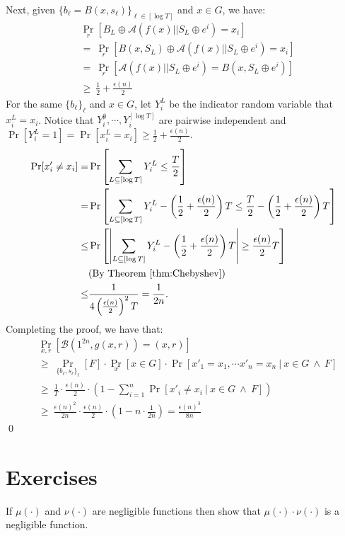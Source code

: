 \documentclass[12pt]{tufte-book}
\newcommand{\ma}{\mathcal{A}}
\begin{document}
Next, given $\{ b_\ell = B(x,s_\ell) \}_{\ell \in [\log T]}$ and $x\in G$, we have:
\begin{align*}
&\Pr_{r} \left[  B_L \oplus \ma(f(x) || S_L \oplus e^i) = x_i \right] \\
&=~ \Pr_{r} \left[ B(x,S_L) \oplus \ma(f(x) || S_L \oplus e^i) = x_i \right]\\
&=~ \Pr_{r} \left[ \ma(f(x) || S_L \oplus e^i) =  B(x,S_L \oplus e^i) \right]\\
&\geq~ \frac{1}{2} + \frac{\epsilon(n)}{2}
\end{align*}
For the same $\{ b_\ell \}_\ell$ and $x\in G$, let $Y_i^L$ be the indicator random variable that $x_i^L = x_i$.
Notice that $Y_i^\emptyset, \cdots, Y_i^{[\log T]}$ are pairwise independent and $\Pr[Y_i^L=1] = \Pr[x_i^L = x_i] \geq \frac{1}{2} + \frac{\epsilon(n)}{2}$.
\begin{align*}
\Pr[x'_i \neq x_i] =& \Pr\left[\sum_{L \subseteq [\log T]} Y_i^L \leq \frac{T}{2} \right]\\
=& \Pr\left[\sum_{L \subseteq [\log T]} Y_i^L - \left(\frac{1}{2} +  \frac{\epsilon(n)}{2} \right)T \leq \frac{T}{2} - \left(\frac{1}{2} +  \frac{\epsilon(n)}{2} \right)T \right]\\
\leq& \Pr\left[ \left| \sum_{L \subseteq [\log T]} Y_i^L - \left(\frac{1}{2} +  \frac{\epsilon(n)}{2} \right)T \right| \geq \frac{\epsilon(n)}{2} T \right]\\
& \text{(By Theorem~\ref{thm:Chebyshev})}\\
\leq& \frac{1}{4\left( \frac{\epsilon(n)}{2}\right)^2T} = \frac{1}{2n}.
\end{align*}
Completing the proof, we have that:
\begin{align*}
& \Pr_{x,r}[\mathcal{B}(1^{2n}, g(x,r)) = (x,r)]\\
&\geq~  \Pr_{\{ b_\ell, s_\ell \}_\ell}\left[ F \right] \cdot  \Pr_x [x \in G] \cdot \Pr[x'_1 = x_1, \cdots x'_n = x_n ~|~ x \in G ~\wedge~ F]\\
&\geq~ \frac{1}{T} \cdot \frac{\epsilon(n)}{2} \cdot \left(1- \sum_{i=1}^n\Pr[x'_i \neq x_i ~|~  x \in G ~\wedge~ F]\right)\\
&\geq~ \frac{\epsilon(n)^2}{2n} \cdot \frac{\epsilon(n)}{2} \cdot \left(1- n \cdot\frac{1}{2n} \right) =  \frac{\epsilon(n)^3}{8n}
\end{align*}
\qed



\newpage
\section*{Exercises}
\begin{exercise}
\label{ex:product} If $\mu(\cdot)$ and $\nu(\cdot)$ are negligible functions then show that $\mu(\cdot) \cdot \nu(\cdot)$ is a negligible function.
\end{exercise}
\end{document}
